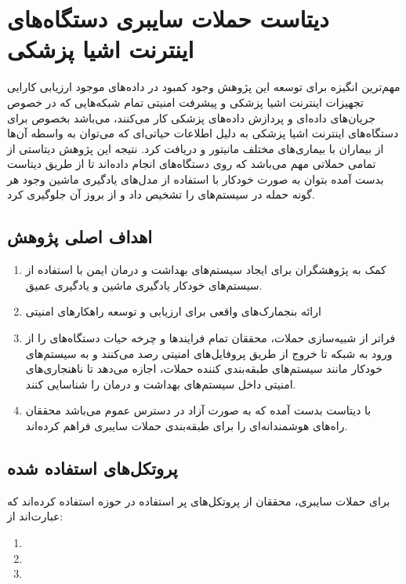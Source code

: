 \section{دیتاست حملات سایبری دستگاه‌های اینترنت اشیا پزشکی }

مهم‌ترین انگیزه برای توسعه این پژوهش \cite{dadkhah2024ciciomt2024} وجود کمبود در
داده‌های موجود ارزیابی کارایی تجهیزات اینترنت اشیا پزشکی و پیشرفت امنیتی تمام
شبکه‌هایی که در خصوص جریان‌های داده‌ای و پردازش داده‌های پزشکی کار می‌کنند،
می‌باشد بخصوص برای دستگاه‌های اینترنت اشیا پزشکی به دلیل اطلاعات حیاتی‌ای که
می‌توان به واسطه آن‌ها از بیماران با بیماری‌های مختلف مانیتور و دریافت کرد.
نتیجه این پژوهش دیتاستی از تمامی حملاتی مهم می‌باشد که روی دستگاه‌های 
انجام داده‌اند تا از طریق دیتاست بدست آمده بتوان به صورت خودکار با استفاده از
مدل‌های یادگیری ماشین وجود هر گونه حمله در سیستم‌های  را تشخیص داد و از
بروز آن جلوگیری کرد.

\subsection{اهداف اصلی پژوهش}

\begin{enumerate}
    \item کمک به پژوهشگران برای ایجاد سیستم‌های بهداشت و درمان ایمن با استفاده
    از سیستم‌های خودکار یادگیری ماشین و یادگیری عمیق.
    \item ارائه بنجمارک‌های واقعی برای ارزیابی و توسعه راهکار‌های امنیتی
    \item فراتر از شبیه‌سازی حملات، محققان تمام فرایند‌ها و چرخه حیات دستگاه‌های
     را از ورود به شبکه تا خروج از طریق پروفایل‌های امنیتی رصد می‌کنند
    و به سیستم‌های خودکار مانند سیستم‌های طبقه‌بندی کننده حملات، اجازه می‌دهد تا
    ناهنجاری‌های امنیتی داخل سیستم‌های بهداشت و درمان را شناسایی کنند.
    \item با دیتاست بدست آمده \cite{ciciomt2024Dataset} که به صورت آزاد در دسترس
    عموم می‌باشد محققان راه‌های هوشمندانه‌ای را برای طبقه‌بندی حملات سایبری
    فراهم کرده‌اند.
\end{enumerate}

\subsection{پروتکل‌های استفاده شده}

برای حملات سایبری، محققان از پروتکل‌های پر استفاده در حوزه  استفاده
کرده‌اند که عبارت‌اند از:

\begin{enumerate}
    \item {}
    \item {}
    \item {}
\end{enumerate}


